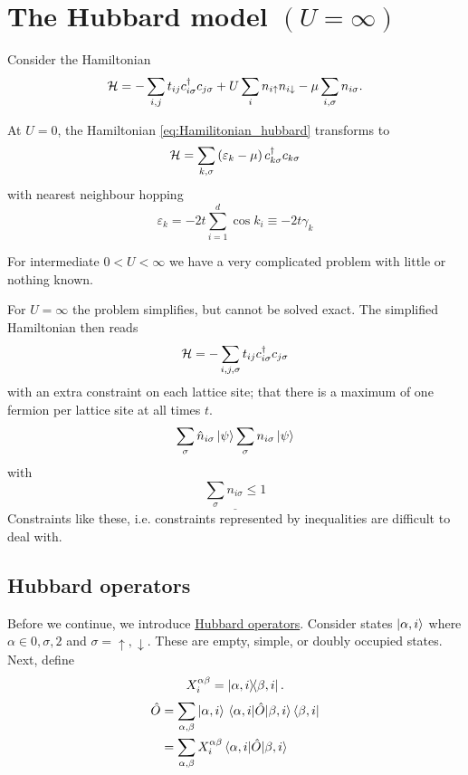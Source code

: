 \section{The Hubbard model $(U = \infty)$}

Consider the Hamiltonian 
\begin{equation}
\label{eq:Hamilitonian_hubbard}
\mathcal{H} = -\sum_{i,j}t_{ij}c_{i\sigma}^\dagger c_{j\sigma} + U\sum_{i}n_{i\uparrow}n_{i\downarrow} - \mu\sum_{i,\sigma}n_{i\sigma}.
\end{equation}

At \underline{$U = 0$}, the Hamiltonian \eqref{eq:Hamilitonian_hubbard} transforms to
\begin{equation}
\mathcal{H} = \sum_{k,\sigma}\left(\varepsilon_k - \mu\right)c_{k\sigma}^\dagger c_{k\sigma}
\end{equation} with nearest neighbour hopping 
\begin{equation*}
\varepsilon_k = -2t\sum_{i = 1}^d\cos k_i \equiv -2t\gamma_k
\end{equation*}

For intermediate \underline{$0<U<\infty$} we have a very complicated problem with little or nothing known. 

For \underline{$U = \infty$} the problem simplifies, but cannot be solved exact. The simplified Hamiltonian then reads 
\begin{equation}
\mathcal{H} = -\sum_{i,j,\sigma}t_{ij}c_{i\sigma}^\dagger c_{j\sigma}
\end{equation}
with an extra constraint on each lattice site; that there is a maximum of one fermion per lattice site at all times $t$.
\begin{equation*}
\sum_\sigma \hat{n}_{i\sigma}\ket{\psi} \sum_\sigma n_{i\sigma}\ket{\psi}
\end{equation*}
with
\begin{equation*}
\underline{\sum_\sigma n_{i\sigma} \le 1}
\end{equation*}
Constraints like these, i.e. constraints represented by inequalities are difficult to deal with. 

\subsection{Hubbard operators}
Before we continue,
we introduce \underline{Hubbard operators}. Consider states \(\ket{\alpha, i}\) where \(\alpha \in 0, \sigma, 2\) and \(\sigma = \uparrow, \downarrow\). These are empty, simple, or doubly occupied states. 
Next, define
\begin{equation}
\label{eq:Hubbard_operators}
X_i^{\alpha\beta} = \dyad{\alpha, i}{\beta, i}.
\end{equation}
\begin{align}
\hat{O} &= \sum_{\alpha, \beta}\ket{\alpha, i}\mel{\alpha, i}{\hat{O}}{\beta, i}\bra{\beta, i}\nonumber \\
&= \sum_{\alpha, \beta}X_i^{\alpha\beta}\mel{\alpha, i}{\hat{O}}{\beta, i} \nonumber
\end{align}

